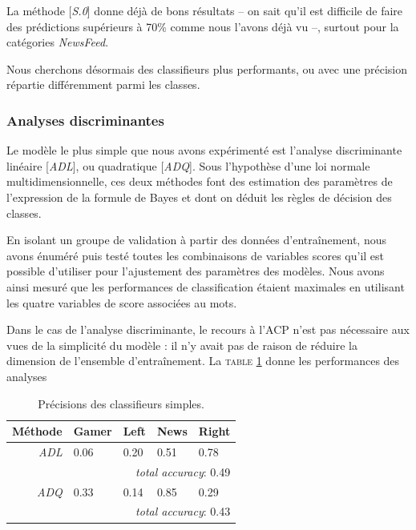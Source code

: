 \documentclass[twocolumn,10pt]{article}
\begin{document}
La méthode [\textit{S.0}] donne déjà de bons résultats -- on sait qu'il est difficile de faire des prédictions supérieurs à 70\% comme nous l'avons déjà vu --, surtout pour la catégories \textit{NewsFeed}.

Nous cherchons désormais des classifieurs plus performants, ou avec une précision répartie différemment parmi les classes.

\subsubsection{Analyses discriminantes}

Le modèle le plus simple que nous avons expérimenté est l'analyse discriminante linéaire [\textit{ADL}], ou quadratique [\textit{ADQ}]. Sous l'hypothèse d'une loi normale multidimensionnelle, ces deux méthodes font des estimation des paramètres de l'expression de la formule de Bayes et dont on déduit les règles de décision des classes.

En isolant un groupe de validation à partir des données d'entraînement, nous avons énuméré puis testé toutes les combinaisons de variables scores qu'il est possible d'utiliser pour l'ajustement des paramètres des modèles. Nous avons ainsi mesuré que les performances de classification étaient maximales en utilisant les quatre variables de score associées au mots.

Dans le cas de l'analyse discriminante, le recours à l'ACP n'est pas nécessaire aux vues de la simplicité du modèle : il n'y avait pas de raison de réduire la dimension de l'ensemble d'entraînement. La \textsc{table} \ref{tab:PAD} donne les performances des analyses 

\begin{table}[htbp]
\begin{center}
\noindent\begin{tabular}{r|llll}
Méthode & Gamer & Left & News & Right \\ 
\hline 
\textit{ADL} & 0.06 & 0.20 & 0.51 & 0.78 \\
 & \multicolumn{4}{|r}{\textit{total accuracy}: 0.49} \\
\vspace{1mm}
\textit{ADQ} & 0.33 & 0.14 & 0.85 & 0.29 \\
 & \multicolumn{4}{|r}{\textit{total accuracy}: 0.43} \\
\end{tabular}
\caption{\label{tab:PAD} Précisions des classifieurs simples.}
\end{center} 
\end{table}
\end{document}
